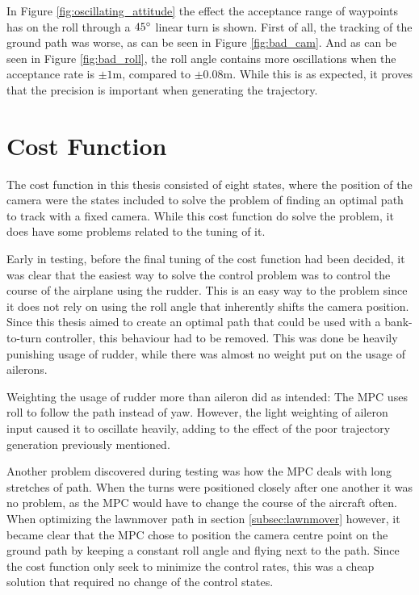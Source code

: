 In Figure \ref{fig:oscillating_attitude} the effect the acceptance range of waypoints has on the roll through a $45\degree$ linear turn is shown. First of all, the tracking of the ground path was worse, as can be seen in Figure \ref{fig:bad_cam}. And as can be seen in Figure \ref{fig:bad_roll}, the roll angle contains more oscillations when the acceptance rate is $\pm 1$m, compared to $\pm 0.08$m. While this is as expected, it proves that the precision is important when generating the trajectory.

\section{Cost Function}

The cost function in this thesis consisted of eight states, where the position of the camera were the states included to solve the problem of finding an optimal path to track with a fixed camera. While this cost function do solve the problem, it does have some problems related to the tuning of it.

Early in testing, before the final tuning of the cost function had been decided, it was clear that the easiest way to solve the control problem was to control the course of the airplane using the rudder. This is an easy way to the problem since it does not rely on using the roll angle that inherently shifts the camera position. Since this thesis aimed to create an optimal path that could be used with a bank-to-turn controller, this behaviour had to be removed. This was done be heavily punishing usage of rudder, while there was almost no weight put on the usage of ailerons.

Weighting the usage of rudder more than aileron did as intended: The MPC uses roll to follow the path instead of yaw. However, the light weighting of aileron input caused it to oscillate heavily, adding to the effect of the poor trajectory generation previously mentioned.

Another problem discovered during testing was how the MPC deals with long stretches of path. When the turns were positioned closely after one another it was no problem, as the MPC would have to change the course of the aircraft often. When optimizing the lawnmover path in section \ref{subsec:lawnmover} however, it became clear that the MPC chose to position the camera centre point on the ground path by keeping a constant roll angle and flying next to the path. Since the cost function only seek to minimize the control rates, this was a cheap solution that required no change of the control states.

